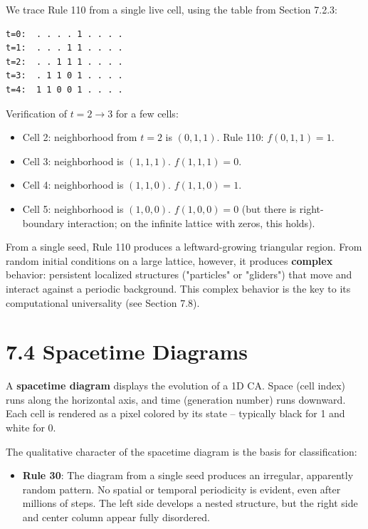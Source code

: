 We trace Rule 110 from a single live cell, using the table from Section 7.2.3:

\begin{lstlisting}
t=0:  . . . . 1 . . . .
t=1:  . . . 1 1 . . . .
t=2:  . . 1 1 1 . . . .
t=3:  . 1 1 0 1 . . . .
t=4:  1 1 0 0 1 . . . .
\end{lstlisting}

Verification of $t = 2 \to 3$ for a few cells:

\begin{itemize}
  \item Cell 2: neighborhood from $t=2$ is $(0, 1, 1)$. Rule 110: $f(0,1,1) = 1$.
  \item Cell 3: neighborhood is $(1, 1, 1)$. $f(1,1,1) = 0$.
  \item Cell 4: neighborhood is $(1, 1, 0)$. $f(1,1,0) = 1$.
  \item Cell 5: neighborhood is $(1, 0, 0)$. $f(1,0,0) = 0$ (but there is right-boundary interaction; on the infinite lattice with zeros, this holds).
\end{itemize}

From a single seed, Rule 110 produces a leftward-growing triangular region. From random initial conditions on a large lattice, however, it produces \textbf{complex} behavior: persistent localized structures ("particles" or "gliders") that move and interact against a periodic background. This complex behavior is the key to its computational universality (see Section 7.8).


\section{7.4 Spacetime Diagrams}

A \textbf{spacetime diagram} displays the evolution of a 1D CA. Space (cell index) runs along the horizontal axis, and time (generation number) runs downward. Each cell is rendered as a pixel colored by its state -- typically black for 1 and white for 0.

The qualitative character of the spacetime diagram is the basis for classification:

\begin{itemize}
  \item \textbf{Rule 30}: The diagram from a single seed produces an irregular, apparently random pattern. No spatial or temporal periodicity is evident, even after millions of steps. The left side develops a nested structure, but the right side and center column appear fully disordered.
\end{itemize}

